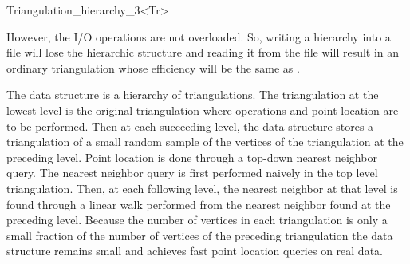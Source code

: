 \begin{ccRefClass}{Triangulation_hierarchy_3<Tr>}
\begin{ccDeprecated}
However, the I/O operations are not overloaded. So, writing a
hierarchy into a file will lose the hierarchic structure and reading
it from the file will result in an ordinary triangulation whose
efficiency will be the same as .

\ccImplementation
The data structure is a hierarchy 
of triangulations. The triangulation at the lowest level is
the original triangulation where operations and point location are to 
be performed.
Then at each succeeding level, the data structure
stores a triangulation of a small random sample of the vertices
of the triangulation at the preceding level. Point location
is done through a top-down nearest neighbor query.
The nearest neighbor query is first
performed naively in the top level triangulation.
Then, at each following level, the nearest neighbor at that level
is found through a linear walk performed from
the nearest neighbor found at the preceding level.
Because the number of vertices in each triangulation is only a small
fraction of the number of vertices of the preceding triangulation 
the data structure remains small and achieves fast point location 
queries on real
data. 

\ccSeeAlso
{}\\

\end{ccDeprecated}

\end{ccRefClass}
